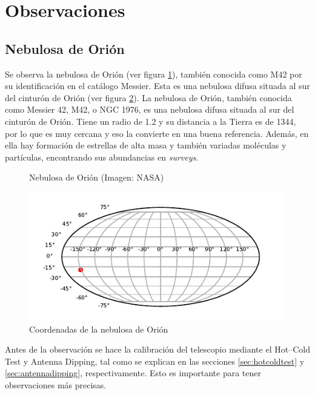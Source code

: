 \section{Observaciones}

\subsection{Nebulosa de Orión}

Se observa la nebulosa de Orión (ver figura \ref{fig:m42}), también conocida como M42 por su identificación en el catálogo Messier. Esta es una nebulosa difusa situada al sur del cinturón de Orión (ver figura \ref{fig:lb}).
La nebulosa de Orión, también conocida como Messier 42, M42, o NGC 1976, es una nebulosa difusa situada al sur del cinturón de Orión. Tiene un radio de \SI{1.2}{\lightyear} y su distancia a la Tierra es de \SI{1344}{\lightyear}, por lo que es muy cercana y eso la convierte en una buena referencia. Además, en ella hay formación de estrellas de alta masa y también variadas moléculas y partículas, encontrando sus abundancias en \textit{surveys}.

\begin{figure}[htbp]
	\centering
	\caption{Nebulosa de Orión (Imagen: NASA)}
	\label{fig:m42}
\end{figure}

\begin{figure}[htbp]
	\centering
	\includegraphics{lb.pdf}
	\caption{Coordenadas de la nebulosa de Orión}
	\label{fig:lb}
\end{figure}

Antes de la observación se hace la calibración del telescopio mediante el Hot--Cold Test y Antenna Dipping, tal como se explican en las secciones \ref{sec:hotcoldtest} y \ref{sec:antennadipping}, respectivamente. Esto es importante para tener observaciones más precisas.

